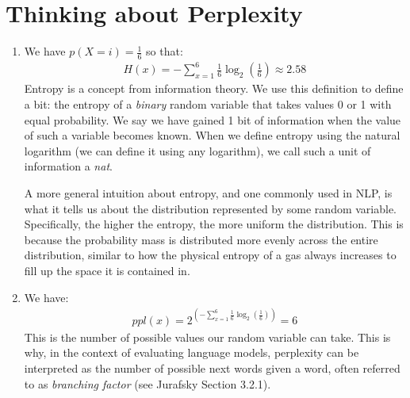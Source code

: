 \documentclass[11pt,a4paper]{article}
\begin{document}
\section{Thinking about Perplexity}

\begin{enumerate}[label=(\alph*)]
    \item We have $p(X = i) = \frac{1}{6}$ so that:
          \begin{align*}
              H(x) = -\sum_{x=1}^6 \frac{1}{6}\log_2\left(\frac{1}{6}\right) \approx 2.58
          \end{align*}
          Entropy is a concept from information theory.
          We use this definition to define a bit: the entropy of a \emph{binary}
          random variable that takes values 0 or 1 with equal probability.
          We say we have gained 1 bit of information when the value of such a
          variable becomes known.
          When we define entropy using the natural logarithm (we can define it
          using any logarithm), we call such a unit of information a \emph{nat}.

          A more general intuition about entropy, and one commonly used in NLP,
          is what it tells us about the distribution represented by some random
          variable.
          Specifically, the higher the entropy, the more uniform the
          distribution.
          This is because the probability mass is distributed more evenly across
          the entire distribution, similar to how the physical entropy of a gas
          always increases to fill up the space it is contained in.
    \item We have:
          \begin{align*}
              ppl(x) = 2^{\left(-\sum_{x=1}^6 \frac{1}{6}\log_2\left(\frac{1}{6}\right)\right)} = 6
          \end{align*}
          This is the number of possible values our random variable can take.
          This is why, in the context of evaluating language models, perplexity
          can be interpreted as the number of possible next words given a word,
          often referred to as \emph{branching factor} (see Jurafsky Section
          3.2.1).


\end{enumerate}
\end{document}
